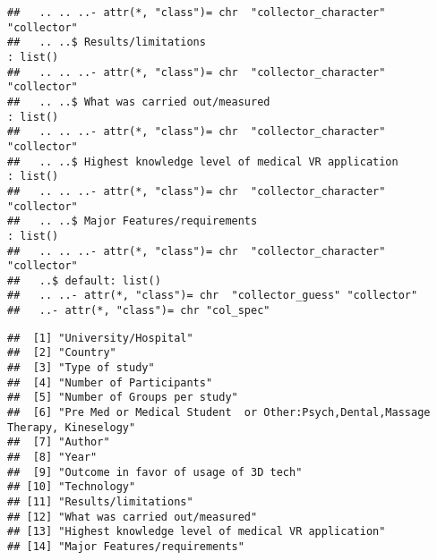 \documentclass[]{article}
\newenvironment{Shaded}{\begin{snugshade}}{\end{snugshade}}
\newcommand{\DataTypeTok}[1]{\textcolor[rgb]{0.13,0.29,0.53}{#1}}
\newcommand{\KeywordTok}[1]{\textcolor[rgb]{0.13,0.29,0.53}{\textbf{#1}}}
\newcommand{\NormalTok}[1]{#1}
\newcommand{\OperatorTok}[1]{\textcolor[rgb]{0.81,0.36,0.00}{\textbf{#1}}}
\newcommand{\StringTok}[1]{\textcolor[rgb]{0.31,0.60,0.02}{#1}}
\begin{document}
\begin{verbatim}
##   .. .. ..- attr(*, "class")= chr  "collector_character" "collector"
##   .. ..$ Results/limitations                                                          : list()
##   .. .. ..- attr(*, "class")= chr  "collector_character" "collector"
##   .. ..$ What was carried out/measured                                                : list()
##   .. .. ..- attr(*, "class")= chr  "collector_character" "collector"
##   .. ..$ Highest knowledge level of medical VR application                            : list()
##   .. .. ..- attr(*, "class")= chr  "collector_character" "collector"
##   .. ..$ Major Features/requirements                                                  : list()
##   .. .. ..- attr(*, "class")= chr  "collector_character" "collector"
##   ..$ default: list()
##   .. ..- attr(*, "class")= chr  "collector_guess" "collector"
##   ..- attr(*, "class")= chr "col_spec"
\end{verbatim}

\begin{verbatim}
##  [1] "University/Hospital"                                                          
##  [2] "Country"                                                                      
##  [3] "Type of study"                                                                
##  [4] "Number of Participants"                                                       
##  [5] "Number of Groups per study"                                                   
##  [6] "Pre Med or Medical Student  or Other:Psych,Dental,Massage Therapy, Kineselogy"
##  [7] "Author"                                                                       
##  [8] "Year"                                                                         
##  [9] "Outcome in favor of usage of 3D tech"                                         
## [10] "Technology"                                                                   
## [11] "Results/limitations"                                                          
## [12] "What was carried out/measured"                                                
## [13] "Highest knowledge level of medical VR application"                            
## [14] "Major Features/requirements"
\end{verbatim}

\begin{Shaded}
\end{Shaded}
\end{document}
